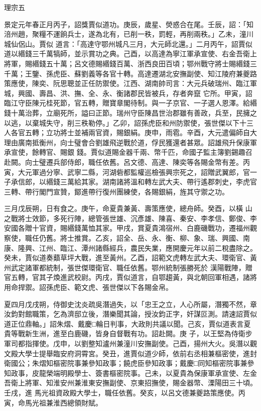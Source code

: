 
\begin{pinyinscope}

 理宗五



 景定元年春正月丙子，詔獎賈似道功。庚辰，歲星、熒惑合在尾。壬辰，詔：「知涪州趙，聚糧不運餉兵士，遂為北有，已削一秩，罰輕，再削兩秩。」乙未，潼川城仙侶山。賈似
 道言：「高達守鄂州城凡三月，大元師北還。」二月丙午，詔賈似道以緡錢三千萬犒師，並示賞功之典。己酉，以高達為寧江軍承宣使、右金吾衛上將軍，賜緡錢五十萬；呂文德賜緡錢百萬、浙西良田百頃；鄂州戰守將士賜緡錢三千萬；王鑒、孫虎臣、蘇劉義等各官十轉。高達遷湖北安撫副使、知江陵府兼夔路策應使，陳奕、阮思聰並正任防禦使。江西、湖南帥司言：大元兵破瑞州、臨江軍城，興國、壽昌、洪、撫、全、永、衡諸郡民皆被兵，存者奔竄
 它所。甲寅，詔臨江守臣陳元桂死節，官五轉，贈寶章閣待制。與一子京官、一子選人恩澤。給緡錢十萬治葬，立廟死所，謚曰正節。瑞州守臣陳昌世治郡雖有善政，兵至，民擁之以逃，以棄城失守，削三秩勒停。」乙卯，詔孫虎臣和州防禦使，張世傑以下十三人各官五轉；立功將士並補兩官資，賜銀絹。庚申，雨雹。辛酉，大元遣偏師自大理由廣南抵衡州，向士璧會合劉雄飛逆戰於道，俘民獲還者甚眾。詔雄飛升保康軍承宣使，餘轉官、賜銀
 錢。賈似道賜金器千兩、幣千匹，命國子監主簿劉錫趣召赴闕。向士璧遷兵部侍郎，職任依舊。呂文德、高達、陳奕等各賜金幣有差。丙寅，大元軍過分寧、武寧二縣，河湖砦都監權巡檢張興宗死之，詔贈武翼郎，官一子承信郎，以緡錢三萬給其家。湖南諸將溫和轉左武大夫、帶行遙郡刺史，李虎官三轉、帶行閣門宣贊，鄮進帶行復州團練使，各賜銀絹，旌其守禦之功。



 三月戊辰朔，日有食之。庚午，命夏貴兼黃、壽策應使，總舟師。癸酉，以橫
 山之戰將士效節，多死行陣，總管張世雄、沉彥雄、陳喜、秦安、李孝信、鄭俊、李安國各贈十官資，賜緡錢萬恤其家。甲戌，賞夏貴鴻宿州、白鹿磯戰功，遷福州觀察使，職任仍舊。將士推賞。乙亥，詔全、岳、永、衡、柳、象、瑞、興國、南康、隆興、江州、臨江、潭州諸縣經兵，農民失業，應開慶元年以前二稅盡除之。癸未，賈似道奏蘱草坪大戰，進至黃州。乙酉，詔範文虎轉左武大夫、環衛官、黃州武定諸軍都統制，張世傑環衛官、職任依舊。鄂州統制張勝死於
 漢陽戰陣，贈官五轉，官其子煥進武校尉。丙戌，賈似道言，自鄂趨黃，與北朝回軍相遇，諸將用命捍禦。詔孫虎臣、範文虎、張世傑以下各賜金帛。



 夏四月戊戌朔，侍御史沈炎疏吳潛過失，以「忠王之立，人心所屬，潛獨不然，章汝鈞對館職策，乞為濟邸立後，潛樂聞其論，授汝鈞正字，奸謀叵測。請速詔賈似道正位鼎軸。」詔朱熠、戴慶□輪日判事，大政則共議以聞。己亥，賈似道表言夏貴等戰新生洲，進至白鹿磯，皆身自督戰有功。詔赴闕。庚
 子，以王堅為侍衛步軍司都指揮使。戊申，以劉整知瀘州兼潼川安撫副使。己酉，揚州大火。吳潛以觀文殿大學士提舉臨安府洞霄宮。癸丑，進賈似道少師，依前右丞相兼樞密使，進封衛國公；朱熠知樞密院事兼參知政事；饒虎臣參知政事；戴慶□同知樞密院事兼參知政事，皮龍榮端明殿學士、簽書樞密院事。己未，以夏貴為保康軍承宣使、左金吾衛上將軍、知淮安州兼淮東安撫副使、京東招撫使，賜金器幣、溧陽田三十頃。壬戌，進
 馬光祖資政殿大學士，職任依舊。癸亥，以呂文德兼夔路策應使。丙寅，命馬光祖兼淮西總領財賦。




\end{pinyinscope}
